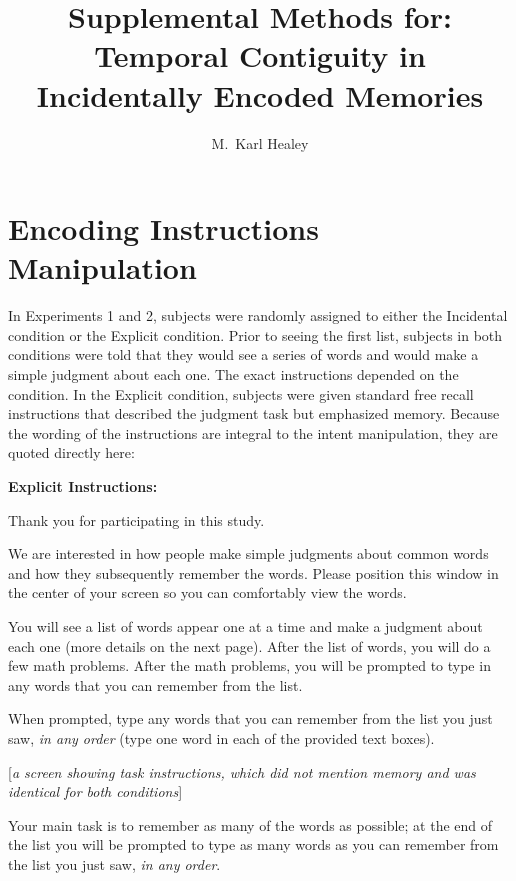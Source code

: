 \documentclass[man,natbib,floatsintext]{apa6} %
\title{Supplemental Methods for: Temporal Contiguity in Incidentally Encoded Memories}
\author{M.\ Karl Healey}
\affiliation{Michigan State University}
\begin{document}
\maketitle


\newcommand\listlength{16} %
\newcommand\presrate{4 seconds} %
\newcommand\isi{1 second} %
\newcommand\DFRDelay{16 seconds} %
\newcommand\recalltime{75 seconds} %
\newcommand\totalss{XX}
\newcommand\totalexcluded{XX}





\section{Encoding Instructions Manipulation} In Experiments 1 and 2, subjects were randomly assigned to either the Incidental condition or the Explicit condition. Prior to seeing the first list, subjects in both conditions were told that they would see a series of words and would make a simple judgment about each one. The exact instructions depended on the condition. In the Explicit condition, subjects were given standard free recall instructions that described the judgment task but emphasized memory. Because the wording of the instructions are integral to the intent manipulation, they are quoted directly here:

\textbf{Explicit Instructions:}

\begin{displayquote}
        Thank you for participating in this study. 

        We are interested in how people make simple judgments about common words and
        how they subsequently remember the words. Please position this window in the center
        of your screen so you can comfortably view the words.

        You will see a list of words appear one at a time and make a judgment about each one
        (more details on the next page). After the list of words, you will do a few math problems.
        After the math problems, you will be prompted to type in any words that you can remember
        from the list.

        When prompted, type any words that you can remember from the list you just saw,
        \emph{in any order} (type one word in each of the provided text boxes).

    [\textit{a screen showing task instructions, which did not mention memory and was identical for both conditions}]

        Your main task is to remember as many of the words as possible; at the end of the list you will be prompted to
    type as many words as you can remember from the list you just saw, \emph{in any order}.
\end{displayquote}
\end{document}
